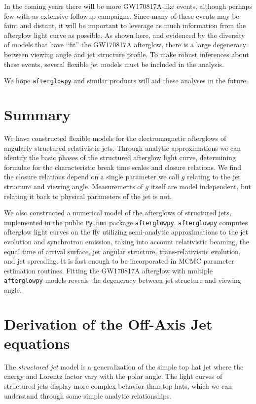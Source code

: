 \documentclass[twocolumn]{aastex62}
\newcommand{\gwbns}{GW170817A}
\newcommand{\afterglowpy}{{\tt afterglowpy}}
\newcommand{\python}{{\tt Python}}
\begin{document}
In the coming years there will be more \gwbns{}-like events, although perhaps few with as extensive followup campaigns.  Since many of these events may be faint and distant, it will be important to leverage as much information from the afterglow light curve as possible.  As shown here, and evidenced by the diversity of models that have ``fit'' the \gwbns{} afterglow, there is a large degeneracy between viewing angle and jet structure profile.  To make robust inferences about these events, several flexible jet models must be included in the analysis.  

We hope \afterglowpy{} and similar products will aid these analyses in the future.  

\section{Summary}

We have constructed flexible models for the electromagnetic afterglows of angularly structured relativistic jets.  Through analytic approximations we can identify the basic phases of the structured afterglow light curve, determining formulae for the characteristic break time scales and closure relations.  We find the closure relations depend on a single parameter we call $g$ relating to the jet structure and viewing angle.  Measurements of $g$ itself are model independent, but relating it back to physical parameters of the jet is not.

We also constructed a numerical model of the afterglows of structured jets, implemented in the public \python{} package \afterglowpy{}. \afterglowpy{} computes afterglow light curves on the fly utilizing semi-analytic approximations to the jet evolution and synchrotron emission, taking into account relativistic beaming, the equal time of arrival surface, jet angular structure, trans-relativistic evolution, and jet spreading.  It is fast enough to be incorporated in MCMC parameter estimation routines.  Fitting the \gwbns{} afterglow with multiple \afterglowpy{} models reveals the degeneracy between jet structure and viewing angle.

\newpage


\appendix
\section{Derivation of the Off-Axis Jet equations}\label{sec:derive1}

  The \emph{structured jet} model is a generalization of the simple top hat jet where the energy and Lorentz factor vary with the polar angle.  The light curves of structured jets display more complex behavior than top hats, which we can understand through some simple analytic relationships.
  
\end{document}
